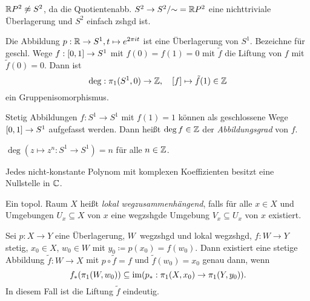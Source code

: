 \documentclass{cheat-sheet}
\begin{document}
\begin{kor}
  $\mathbb{R} P^2 \not\approx S^2$, da die Quotientenabb. $S^2 \to S^2/{\sim} = \mathbb{R} P^2$ eine nichttriviale Überlagerung und $S^2$ einfach zshgd ist.
\end{kor}

\begin{prop}
  Die Abbildung $p : \mathbb{R} \to S^1, t \mapsto e^{2 \pi i t}$ ist eine Überlagerung von $S^1$. Bezeichne für geschl. Wege $f : \left[ 0, 1 \right] \to S^1$ mit $f(0) = f(1) = 0$ mit $\tilde{f}$ die Liftung von $f$ mit $\tilde{f}(0) = 0$. Dann ist
  \[ \mathrm{deg} : \pi_1(S^1, 0) \to \mathbb{Z}, \quad [f] \mapsto \tilde{f}(1) \in \mathbb{Z} \]
  ein Gruppenisomorphismus.
\end{prop}

\begin{defn}
  Stetig Abbildungen $f : S^1 \to S^1$ mit $f(1) = 1$ können als geschlossene Wege $\left[ 0, 1 \right] \to S^1$ aufgefasst werden. Dann heißt $\deg f \in \mathbb{Z}$ der \emph{Abbildungsgrad} von $f$.
\end{defn}

\begin{prop}
  $\deg(z \mapsto z^n : S^1 \to S^1) = n$ für alle $n \in \mathbb{Z}$.
\end{prop}



\begin{kor}
  Jedes nicht-konstante Polynom mit komplexen Koeffizienten besitzt eine Nullstelle in $\mathbb{C}$.
\end{kor}


\begin{defn}
  Ein topol. Raum $X$ heißt \emph{lokal wegzusammenhängend}, falls für alle $x \in X$ und Umgebungen $U_x \subseteq X$ von $x$ eine wegzshgde Umgebung $V_x \subseteq U_x$ von $x$ existiert.
\end{defn}

\begin{satz}
  Sei $p : X \to Y$ eine Überlagerung, $W$~wegzshgd und lokal wegzshgd, $f : W \to Y$ stetig, $x_0 \in X$, $w_0 \in W$ mit $y_0 \coloneqq p(x_0) = f(w_0)$. Dann existiert eine stetige Abbildung $\tilde{f} : W \to X$ mit $p \circ \tilde{f} = f$ und $\tilde{f}(w_0) = x_0$ genau dann, wenn
  \[ f_*(\pi_1(W, w_0)) \subseteq \mathop{\mathrm{im}} (p_* : \pi_1(X, x_0) \to \pi_1(Y, y_0)). \]
  In diesem Fall ist die Liftung $\tilde{f}$ eindeutig.
\end{satz}
\end{document}
